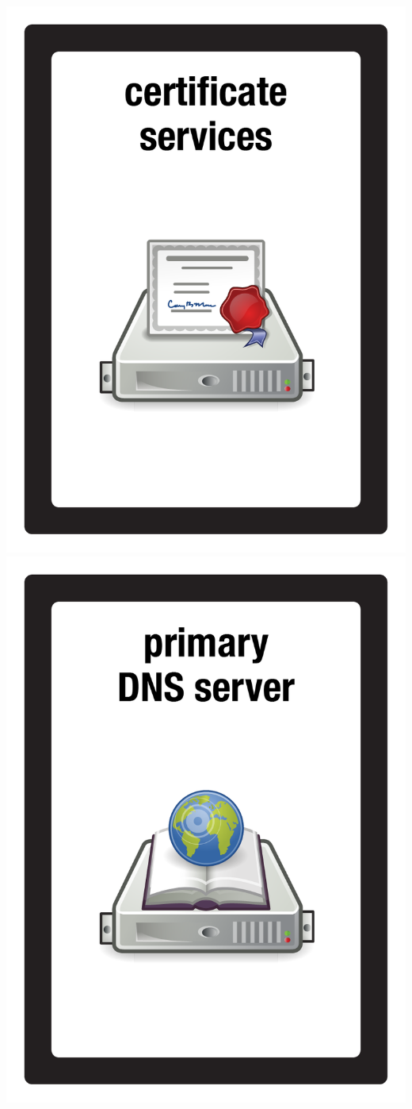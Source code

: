 \documentclass{letter}
\begin{document}
\includegraphics{patch/patch_cert_serv}
\includegraphics{patch/patch_primary_dns}
\end{document}
